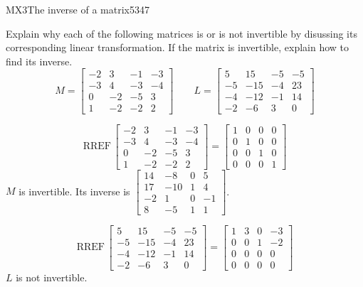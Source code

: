 \begin{exercise}{MX3}{The inverse of a matrix}{5347} 
\begin{exerciseStatement} 

 Explain why each of the following matrices is or is not invertible by disussing its corresponding linear transformation. If the matrix is invertible, explain how to find its inverse. \[
\hspace{2em}
M = \left[\begin{array}{cccc}
-2 & 3 & -1 & -3 \\
-3 & 4 & -3 & -4 \\
0 & -2 & -5 & 3 \\
1 & -2 & -2 & 2
\end{array}\right]
\hspace{2em}
L = \left[\begin{array}{cccc}
5 & 15 & -5 & -5 \\
-5 & -15 & -4 & 23 \\
-4 & -12 & -1 & 14 \\
-2 & -6 & 3 & 0
\end{array}\right]
\hspace{2em}
        \] 

 \end{exerciseStatement}
 \begin{exerciseAnswer} 

 \[\mathrm{RREF}\,\left[\begin{array}{cccc}
-2 & 3 & -1 & -3 \\
-3 & 4 & -3 & -4 \\
0 & -2 & -5 & 3 \\
1 & -2 & -2 & 2
\end{array}\right]=\left[\begin{array}{cccc}
1 & 0 & 0 & 0 \\
0 & 1 & 0 & 0 \\
0 & 0 & 1 & 0 \\
0 & 0 & 0 & 1
\end{array}\right]\] \(M\) is invertible. Its inverse is \(\left[\begin{array}{cccc}
14 & -8 & 0 & 5 \\
17 & -10 & 1 & 4 \\
-2 & 1 & 0 & -1 \\
8 & -5 & 1 & 1
\end{array}\right]\). 

 

 \[\mathrm{RREF}\,\left[\begin{array}{cccc}
5 & 15 & -5 & -5 \\
-5 & -15 & -4 & 23 \\
-4 & -12 & -1 & 14 \\
-2 & -6 & 3 & 0
\end{array}\right]=\left[\begin{array}{cccc}
1 & 3 & 0 & -3 \\
0 & 0 & 1 & -2 \\
0 & 0 & 0 & 0 \\
0 & 0 & 0 & 0
\end{array}\right]\] \(L\) is not invertible. 


\end{exerciseAnswer}
\end{exercise}
